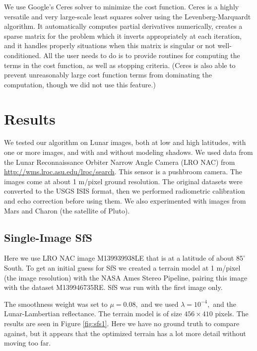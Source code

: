 \documentclass[12pt,oneside]{article}
\begin{document}
We use Google's Ceres solver \citet{agarwal2012ceres} to minimize the
cost function. Ceres is a highly versatile and very large-scale least
squares solver using the Levenberg-Marquardt algorithm. It automatically
computes partial derivatives numerically, creates a sparse matrix for
the problem which it inverts appropriately at each iteration, and it
handles properly situations when this matrix is singular or not
well-conditioned. All the user needs to do is to provide routines for computing
the terms in the cost function, as well as stopping
criteria. (Ceres is also able to prevent unreasonably large cost function
terms from dominating the computation, though we did not use this feature.)

\section{Results}

We tested our algorithm on Lunar images, both at low and high
latitudes, with one or more images, and with and without modeling
shadows.  We used data from the Lunar Reconnaissance Orbiter Narrow
Angle Camera (LRO NAC) from
\url{http://wms.lroc.asu.edu/lroc/search}. This sensor is a pushbroom
camera. The images come at about 1 m/pixel ground resolution. The
original datasets were converted to the USGS ISIS format, then we
performed radiometric calibration and echo correction before using them.
We also experimented with images from Mars and Charon (the satellite of Pluto).

\subsection{Single-Image SfS}
\label{single}

Here we use LRO NAC image M139939938LE that is at a latitude of about
$85^\circ$ South. To get an initial guess for SfS we created a terrain
model at 1 m/pixel (the image resolution) with the NASA Ames Stereo
Pipeline, pairing this image with the dataset M139946735RE. SfS was run
with the first image only.

The smoothness weight was set to $\mu=0.08,$ and we used
$\lambda=10^{-4},$ and the Lunar-Lambertian reflectance. The terrain
model is of size $456 \times 410$ pixels. The results are seen in Figure
\ref{fig:sfs1}.  Here we have no ground truth to compare against, but it
appears that the optimized terrain has a lot more detail without moving
too far.
\end{document}

